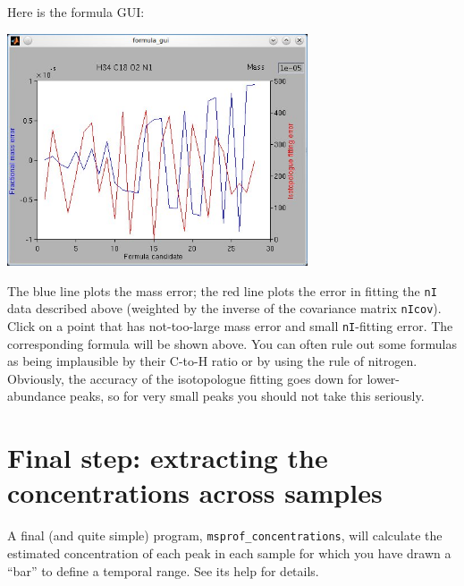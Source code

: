 \documentclass[notitlepage]{revtex4-1}
\begin{document}
Here is the formula GUI:
\begin{center}
\includegraphics[width=3.5in]{figures/formulaGUI}
\end{center}
The blue line plots the mass error; the red line plots the error in fitting the \verb|nI| data described above (weighted by the inverse of the covariance matrix \verb|nIcov|).  Click on a point that has not-too-large mass error and small \verb|nI|-fitting error.  The corresponding formula will be shown above.  You can often rule out some formulas as being implausible by their C-to-H ratio or by using the rule of nitrogen.  Obviously, the accuracy of the isotopologue fitting goes down for lower-abundance peaks, so for very small peaks you should not take this seriously.


\section{Final step: extracting the concentrations across samples}

A final (and quite simple) program, \verb|msprof_concentrations|, will calculate the estimated concentration of each peak in each sample for which you have drawn a ``bar'' to define a temporal range.  See its help for details.
\end{document}
